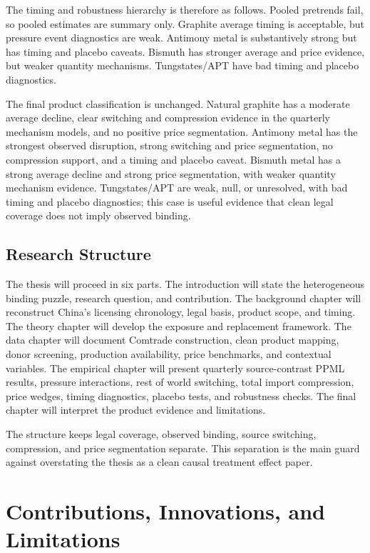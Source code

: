 \documentclass[12pt,a4paper]{article}
\numberwithin{equation}{section}
\begin{document}
The timing and robustness hierarchy is therefore as follows. Pooled pretrends fail, so pooled estimates are summary only. Graphite average timing is acceptable, but pressure event diagnostics are weak. Antimony metal is substantively strong but has timing and placebo caveats. Bismuth has stronger average and price evidence, but weaker quantity mechanisms. Tungstates/APT have bad timing and placebo diagnostics.

The final product classification is unchanged. Natural graphite has a moderate average decline, clear switching and compression evidence in the quarterly mechanism models, and no positive price segmentation. Antimony metal has the strongest observed disruption, strong switching and price segmentation, no compression support, and a timing and placebo caveat. Bismuth metal has a strong average decline and strong price segmentation, with weaker quantity mechanism evidence. Tungstates/APT are weak, null, or unresolved, with bad timing and placebo diagnostics; this case is useful evidence that clean legal coverage does not imply observed binding.

\subsection{Research Structure}

The thesis will proceed in six parts. The introduction will state the heterogeneous binding puzzle, research question, and contribution. The background chapter will reconstruct China's licensing chronology, legal basis, product scope, and timing. The theory chapter will develop the exposure and replacement framework. The data chapter will document Comtrade construction, clean product mapping, donor screening, production availability, price benchmarks, and contextual variables. The empirical chapter will present quarterly source-contrast PPML results, pressure interactions, rest of world switching, total import compression, price wedges, timing diagnostics, placebo tests, and robustness checks. The final chapter will interpret the product evidence and limitations.

The structure keeps legal coverage, observed binding, source switching, compression, and price segmentation separate. This separation is the main guard against overstating the thesis as a clean causal treatment effect paper.

\section{Contributions, Innovations, and Limitations}
\end{document}
